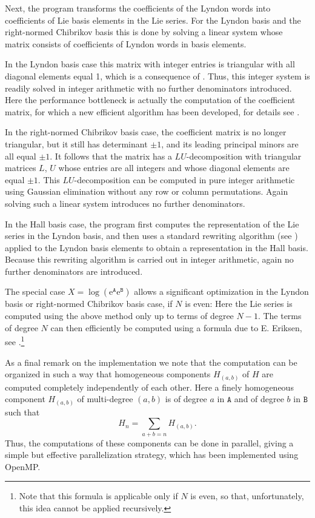 \documentclass[11pt,a4paper]{article}
\newcommand{\ee}{\mathrm{e}}
\renewcommand{\AA}{\mathtt{A}}
\newcommand{\BB}{\mathtt{B}}
\begin{document}
Next, the program transforms the coefficients of the Lyndon words into coefficients
of Lie basis elements in the Lie series.
For the Lyndon basis and the right-normed Chibrikov basis this is done by solving a linear system whose matrix consists of coefficients of Lyndon words in basis elements.

In the Lyndon basis case this matrix with integer entries is triangular with all diagonal
elements equal 1, which is a consequence of \cite[Theorem~5.1]{Reutenauer}. Thus, this
integer system is readily solved in integer arithmetic with no further denominators introduced.
Here the performance bottleneck is actually the computation of the coefficient matrix,
for which a new efficient algorithm has been developed, for details see \cite{HHfast}. 

In the right-normed Chibrikov basis case, the coefficient matrix is no longer
triangular, but it still has determinant $\pm 1$, and its leading principal
minors are all equal $\pm 1$. It follows that the matrix has a $LU$-decomposition
with triangular matrices $L$, $U$ whose entries are all integers and whose diagonal
elements are equal $\pm 1$. This $LU$-decomposition can be computed 
in pure integer arithmetic using Gaussian elimination without any row or column permutations.
Again solving such a linear system  introduces no further denominators.

In the Hall basis case, the program first computes the representation of
the Lie series in the Lyndon basis, and then uses a standard rewriting algorithm
(see \cite[Section~4.2]{Reutenauer})
applied to the Lyndon basis elements to obtain a representation in the Hall basis.
Because this rewriting algorithm is carried out in integer arithmetic, again no further
denominators are introduced.

The special case $X=\log(\ee^\AA\ee^\BB)$ allows a significant optimization in 
the Lyndon basis or right-normed Chibrikov basis case, if $N$ is even: 
Here the Lie series is computed using the above method only up to terms
of degree $N-1$. The terms of degree $N$ can then efficiently be computed using a
formula due to E. Eriksen, see \cite[Section~III.A]{Eriksen}.\footnote{Note that
this formula is applicable only if $N$ is even, so that, unfortunately, this idea cannot be 
applied recursively.}


As a final remark on the implementation we note that the computation can
be organized in such a way that  homogeneous components 
$H_{(a,b)}$ of $H$ are computed completely independently of each other.
Here a finely homogeneous component $H_{(a,b)}$ of multi-degree $(a,b)$
is of degree $a$ in $\AA$ and of degree $b$ in $\BB$ such that
$$H_n = \sum_{a+b=n}H_{(a,b)}.$$
Thus, the computations of these components can be done in parallel, giving a
simple but effective parallelization strategy, which 
has been implemented using OpenMP.
\end{document}
